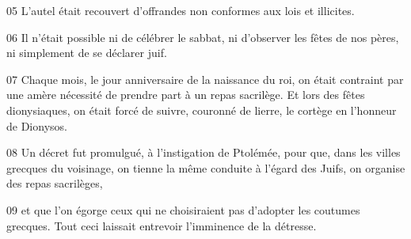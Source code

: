
05 L’autel était recouvert d’offrandes non conformes aux lois et illicites.

06 Il n’était possible ni de célébrer le sabbat, ni d’observer les fêtes de nos pères, ni simplement de se déclarer juif.

07 Chaque mois, le jour anniversaire de la naissance du roi, on était contraint par une amère nécessité de prendre part à un repas sacrilège. Et lors des fêtes dionysiaques, on était forcé de suivre, couronné de lierre, le cortège en l’honneur de Dionysos.

08 Un décret fut promulgué, à l’instigation de Ptolémée, pour que, dans les villes grecques du voisinage, on tienne la même conduite à l’égard des Juifs, on organise des repas sacrilèges,

09 et que l’on égorge ceux qui ne choisiraient pas d’adopter les coutumes grecques. Tout ceci laissait entrevoir l’imminence de la détresse.
